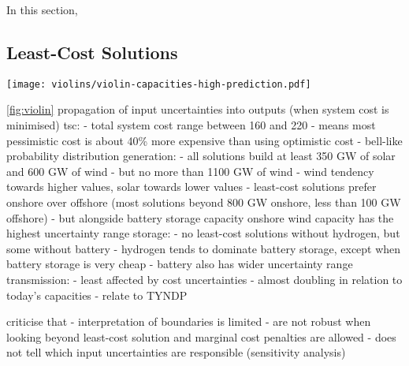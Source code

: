 In this section,

\subsection{Least-Cost Solutions}

\begin{SCfigure}
    \texttt{[image: violins/violin-capacities-high-prediction.pdf]}
    \caption{
      Distribution of total system cost, generation, storage, and transmission capacities
      for least-cost solutions.
    }
    \label{fig:violin}
\end{SCfigure}

\cref{fig:violin}
propagation of input uncertainties into outputs (when system cost is minimised)
tsc:
- total system cost range between 160 and 220
- means most pessimistic cost is about 40\% more expensive than using optimistic cost
- bell-like probability distribution
generation:
- all solutions build at least 350 GW of solar and 600 GW of wind
- but no more than 1100 GW of wind
- wind tendency towards higher values, solar towards lower values
- least-cost solutions prefer onshore over offshore (most solutions beyond 800 GW onshore, less than 100 GW offshore)
- but alongside battery storage capacity onshore wind capacity has the highest uncertainty range
storage:
- no least-cost solutions without hydrogen, but some without battery
- hydrogen tends to dominate battery storage, except when battery storage is very cheap
- battery also has wider uncertainty range
transmission:
- least affected by cost uncertainties
- almost doubling in relation to today's capacities
- relate to TYNDP

criticise that
- interpretation of boundaries is limited
- are not robust when looking beyond least-cost solution and marginal cost penalties are allowed
- does not tell which input uncertainties are responsible (sensitivity analysis)


